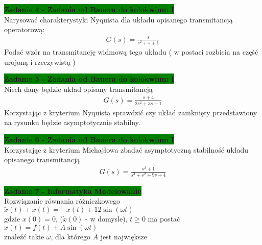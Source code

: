 \documentclass[a4paper,11pt]{article}
\begin{document}
\begin{framed}
\textbf{\colorbox{green}{Zadanie 4 - Zadania od Bauera do kolokwium I }} \\ 
Narysować charakterystyki Nyquista dla układu opisanego transmitancją operatorową:
\begin{align*}
G(s)=\frac{s}{s^{2}+s+1}
\end{align*}
Podać wzór na transmitancję widmową tego układu ( w postaci rozbicia na część urojoną i rzeczywistą )
\end{framed}


\begin{framed}
\textbf{\colorbox{green}{Zadanie 5 - Zadania od Bauera do kolokwium I }} \\ 
Niech dany będzie układ opisany transmitancją
\begin{align*}
G(s)=\frac{s+4}{2s^{2}+3s+1}
\end{align*}
Korzystając z kryterium Nyquista sprawdzić czy układ zamknięty przedstawiony na rysunku będzie asymptotycznie stabilny.
\begin{figure}[H]
\centering
{}
\label{fig:opt_par_1}
\end{figure}

\end{framed}

\begin{framed}
\textbf{\colorbox{green}{Zadanie 6 - Zadania od Bauera do kolokwium I }} \\ 
Korzystając z kryterium Michajłowa zbadać asymptotyczną stabilność układu opisanego transmitancją
\begin{align*}
G(s)=\frac{s^{2}+1}{s^{3}+s^{2}+9s+4}
\end{align*}
\end{framed}


\begin{framed}
\textbf{\colorbox{green}{Zadanie 7 - Informatyka Modelowanie }} \\ 
Rozwiązanie równania różniczkowego\\
	$\ddot{x}(t)+\dot{x}(t)=-x(t)+12\sin({\omega t})$\\
	gdzie $x(0)=0$, ($\dot{x}(0)$ - w domysle), $t \geq 0$ ma postać\\
	$x(t)=f(t)+A\sin({\omega t})$\\
znaleźć takie $\omega$, dla którego $A$ jest największe\\
\end{framed}
\end{document}
